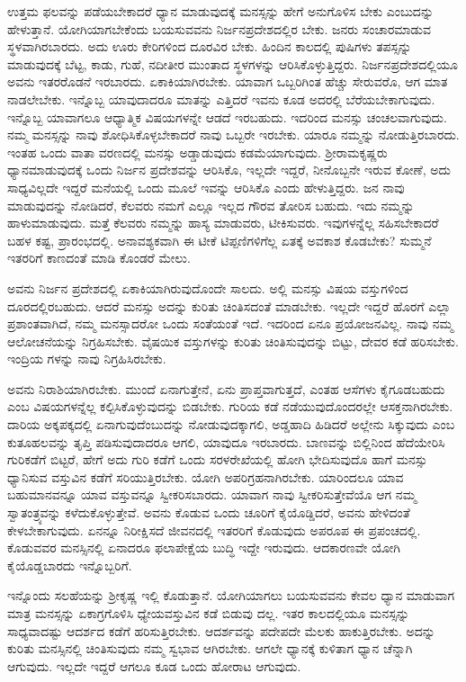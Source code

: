 ಉತ್ತಮ ಫಲವನ್ನು ಪಡೆಯಬೇಕಾದರೆ ಧ್ಯಾನ ಮಾಡುವುದಕ್ಕೆ ಮನಸ್ಸನ್ನು ಹೇಗೆ ಅನುಗೊಳಿಸ ಬೇಕು ಎಂಬುದನ್ನು ಹೇಳುತ್ತಾನೆ. ಯೋಗಿಯಾಗಬೇಕೆಂದು ಬಯಸುವವನು ನಿರ್ಜನಪ್ರದೇಶದಲ್ಲಿರ ಬೇಕು. ಜನರು ಸಂಚಾರಮಾಡುವ ಸ್ಥಳವಾಗಿರಬಾರದು. ಅದು ಊರು ಕೇರಿಗಳಿಂದ ದೂರವಿರ ಬೇಕು. ಹಿಂದಿನ ಕಾಲದಲ್ಲಿ ಪುಷಿಗಳು ತಪಸ್ಸನ್ನು ಮಾಡುವುದಕ್ಕೆ ಬೆಟ್ಟ, ಕಾಡು, ಗುಹೆ, ನದೀತೀರ ಮುಂತಾದ ಸ್ಥಳಗಳನ್ನು ಆರಿಸಿಕೊಳ್ಳುತ್ತಿದ್ದರು. ನಿರ್ಜನಪ್ರದೇಶದಲ್ಲಿಯೂ ಅವನು ಇತರರೊಡನೆ ಇರಬಾರದು. ಏಕಾಕಿಯಾಗಿರಬೇಕು. ಯಾವಾಗ ಒಬ್ಬರಿಗಿಂತ ಹೆಚ್ಚು ಸೇರುವರೊ, ಆಗ ಮಾತ ನಾಡಲೇಬೇಕು. ಇನ್ನೊಬ್ಬ ಯಾವುದಾದರೂ ಮಾತನ್ನು ಎತ್ತಿದರೆ ಇವನು ಕೂಡ ಅದರಲ್ಲಿ ಬೆರೆಯಬೇಕಾಗುವುದು. ಇನ್ನೊಬ್ಬ ಯಾವಾಗಲೂ ಆಧ್ಯಾತ್ಮಿಕ ವಿಷಯಗಳನ್ನೇ ಆಡದೆ ಇರಬಹುದು. ಇದರಿಂದ ಮನಸ್ಸು ಚಂಚಲವಾಗುವುದು. ನಮ್ಮ ಮನಸ್ಸನ್ನು ನಾವು ಶೋಧಿಸಿಕೊಳ್ಳಬೇಕಾದರೆ ನಾವು ಒಬ್ಬರೇ ಇರಬೇಕು. ಯಾರೂ ನಮ್ಮನ್ನು ನೋಡುತ್ತಿರಬಾರದು. ಇಂತಹ ಒಂದು ವಾತಾ ವರಣದಲ್ಲಿ ಮನಸ್ಸು ಅಡ್ಡಾಡುವುದು ಕಡಮೆಯಾಗುವುದು. ಶ್ರೀರಾಮಕೃಷ್ಣರು ಧ್ಯಾನಮಾಡುವುದಕ್ಕೆ ಒಂದು ನಿರ್ಜನ ಪ್ರದೇಶವನ್ನು ಆರಿಸಿಕೊ, ಇಲ್ಲದೇ ಇದ್ದರೆ, ನೀನೊಬ್ಬನೇ ಇರುವ ಕೋಣೆ, ಅದು ಸಾಧ್ಯವಿಲ್ಲದೇ ಇದ್ದರೆ ಮನೆಯಲ್ಲಿ ಒಂದು ಮೂಲೆ ಇವನ್ನು ಆರಿಸಿಕೊ ಎಂದು ಹೇಳುತ್ತಿದ್ದರು. ಜನ ನಾವು ಮಾಡುವುದನ್ನು ನೋಡಿದರೆ, ಕೆಲವರು ನಮಗೆ ಎಲ್ಲೂ ಇಲ್ಲದ ಗೌರವ ತೋರಿಸ ಬಹುದು. ಇದು ನಮ್ಮನ್ನು ಹಾಳುಮಾಡುವುದು. ಮತ್ತೆ ಕೆಲವರು ನಮ್ಮನ್ನು ಹಾಸ್ಯ ಮಾಡುವರು, ಟೀಕಿಸುವರು. ಇವುಗಳನ್ನೆಲ್ಲ ಸಹಿಸಬೇಕಾದರೆ ಬಹಳ ಕಷ್ಟ, ಪ್ರಾರಂಭದಲ್ಲಿ. ಅನಾವಶ್ಯಕವಾಗಿ ಈ ಟೀಕೆ ಟಿಪ್ಪಣಿಗಳಿಗೆಲ್ಲ ಏತಕ್ಕೆ ಅವಕಾಶ ಕೊಡಬೇಕು? ಸುಮ್ಮನೆ ಇತರರಿಗೆ ಕಾಣದಂತೆ ಮಾಡಿ ಕೊಂಡರೆ ಮೇಲು.

ಅವನು ನಿರ್ಜನ ಪ್ರದೇಶದಲ್ಲಿ ಏಕಾಕಿಯಾಗಿರುವುದೊಂದೇ ಸಾಲದು. ಅಲ್ಲಿ ಮನಸ್ಸು ವಿಷಯ ವಸ್ತುಗಳಿಂದ ದೂರದಲ್ಲಿರಬಹುದು. ಆದರೆ ಮನಸ್ಸು ಅದನ್ನು ಕುರಿತು ಚಿಂತಿಸದಂತೆ ಮಾಡಬೇಕು. ಇಲ್ಲದೇ ಇದ್ದರೆ ಹೊರಗೆ ಎಲ್ಲಾ ಪ್ರಶಾಂತವಾಗಿದೆ, ನಮ್ಮ ಮನಸ್ಸಾದರೋ ಒಂದು ಸಂತೆಯಂತೆ ಇದೆ. ಇದರಿಂದ ಏನೂ ಪ್ರಯೋಜನವಿಲ್ಲ. ನಾವು ನಮ್ಮ ಆಲೋಚನೆಯನ್ನು ನಿಗ್ರಹಿಸಬೇಕು. ವೈಷಯಿಕ ವಸ್ತುಗಳನ್ನು ಕುರಿತು ಚಿಂತಿಸುವುದನ್ನು ಬಿಟ್ಟು, ದೇವರ ಕಡೆ ಹರಿಸಬೇಕು. ಇಂದ್ರಿಯ ಗಳನ್ನು ನಾವು ನಿಗ್ರಹಿಸಿರಬೇಕು.

ಅವನು ನಿರಾಶಿಯಾಗಿರಬೇಕು. ಮುಂದೆ ಏನಾಗುತ್ತೇನೆ, ಏನು ಪ್ರಾಪ್ತವಾಗುತ್ತದೆ, ಎಂತಹ ಆಸೆಗಳು ಕೈಗೂಡಬಹುದು ಎಂಬ ವಿಷಯಗಳನ್ನೆಲ್ಲ ಕಲ್ಪಿಸಿಕೊಳ್ಳುವುದನ್ನು ಬಿಡಬೇಕು. ಗುರಿಯ ಕಡೆ ನಡೆಯುವುದೊಂದರಲ್ಲೇ ಆಸಕ್ತನಾಗಿರಬೇಕು. ದಾರಿಯ ಅಕ್ಕಪಕ್ಕದಲ್ಲಿ ಏನಾಗುವುದೆಂಬುದನ್ನು ನೋಡುವುದಕ್ಕಾಗಲಿ, ಅಡ್ಡಹಾದಿ ಹಿಡಿದರೆ ಅಲ್ಲೇನು ಸಿಕ್ಕುವುದು ಎಂಬ ಕುತೂಹಲವನ್ನು ತೃಪ್ತಿ ಪಡಿಸುವುದಾದರೂ ಆಗಲಿ, ಯಾವುದೂ ಇರಬಾರದು. ಬಾಣವನ್ನು ಬಿಲ್ಲಿನಿಂದ ಹೆದೆಯೇರಿಸಿ ಗುರಿಕಡೆಗೆ ಬಿಟ್ಟರೆ, ಹೇಗೆ ಅದು ಗುರಿ ಕಡೆಗೆ ಒಂದು ಸರಳರೇಖೆಯಲ್ಲಿ ಹೋಗಿ ಭೇದಿಸುವುದೊ ಹಾಗೆ ಮನಸ್ಸು ಧ್ಯಾನಿಸುವ ವಸ್ತುವಿನ ಕಡೆಗೆ ಸರಿಯುತ್ತಿರಬೇಕು. ಯೋಗಿ ಅಪರಿಗ್ರಹನಾಗಿರಬೇಕು. ಯಾರಿಂದಲೂ ಯಾವ ಬಹುಮಾನವನ್ನೂ ಯಾವ ವಸ್ತುವನ್ನೂ ಸ್ವೀಕರಿಸಬಾರದು. ಯಾವಾಗ ನಾವು ಸ್ವೀಕರಿಸುತ್ತೇವೆಯೊ ಆಗ ನಮ್ಮ ಸ್ವಾತಂತ್ರ್ಯವನ್ನು ಕಳೆದುಕೊಳ್ಳುತ್ತೇವೆ. ಅವನು ಕೊಡುವ ಒಂದು ಚೂರಿಗೆ ಕೈಯೊಡ್ಡಿದರೆ, ಅವನು ಹೇಳಿದಂತೆ ಕೇಳಬೇಕಾಗುವುದು. ಏನನ್ನೂ ನಿರೀಕ್ಷಿಸದೆ ಜೀವನದಲ್ಲಿ ಇತರರಿಗೆ ಕೊಡುವುದು ಅಪರೂಪ ಈ ಪ್ರಪಂಚದಲ್ಲಿ. ಕೊಡುವವರ ಮನಸ್ಸಿನಲ್ಲಿ ಏನಾದರೂ ಫಲಾಪೇಕ್ಷೆಯ ಬುದ್ಧಿ ಇದ್ದೇ ಇರುವುದು. ಆದಕಾರಣವೇ ಯೋಗಿ ಕೈಯೊಡ್ಡಬಾರದು ಇನ್ನೊಬ್ಬರಿಗೆ.

ಇನ್ನೊಂದು ಸಲಹೆಯನ್ನು ಶ್ರೀಕೃಷ್ಣ ಇಲ್ಲಿ ಕೊಡುತ್ತಾನೆ. ಯೋಗಿಯಾಗಲು ಬಯಸುವವನು ಕೇವಲ ಧ್ಯಾನ ಮಾಡುವಾಗ ಮಾತ್ರ ಮನಸ್ಸನ್ನು ಏಕಾಗ್ರಗೊಳಿಸಿ ಧ್ಯೇಯವಸ್ತುವಿನ ಕಡೆ ಬಿಡುವು ದಲ್ಲ. ಇತರ ಕಾಲದಲ್ಲಿಯೂ ಮನಸ್ಸನ್ನು ಸಾಧ್ಯವಾದಷ್ಟು ಆದರ್ಶದ ಕಡೆಗೆ ಹರಿಸುತ್ತಿರಬೇಕು. ಆದರ್ಶವನ್ನು ಪದೇಪದೇ ಮೆಲಕು ಹಾಕುತ್ತಿರಬೇಕು. ಅದನ್ನು ಕುರಿತು ಮನಸ್ಸಿನಲ್ಲಿ ಚಿಂತಿಸುವುದು ನಮ್ಮ ಸ್ವಭಾವ ಆಗಿರಬೇಕು. ಆಗಲೇ ಧ್ಯಾನಕ್ಕೆ ಕುಳಿತಾಗ ಧ್ಯಾನ ಚೆನ್ನಾಗಿ ಆಗುವುದು. ಇಲ್ಲದೇ ಇದ್ದರೆ ಆಗಲೂ ಕೂಡ ಒಂದು ಹೋರಾಟ ಆಗುವುದು.

